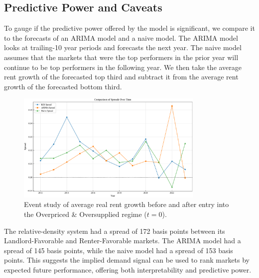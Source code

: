\documentclass[APA,Times1COL]{WileyNJDv5} %
\begin{document}
\subsection{Predictive Power and Caveats}

To gauge if the predictive power offered by the model is significant, we compare it to the forecasts of an ARIMA model and a naive model. The ARIMA model looks at trailing-10 year periods and forecasts the next year. The naive model assumes that the markets that were the top performers in the prior year will continue to be top performers in the following year. We then take the average rent growth of the forecasted top third and subtract it from the average rent growth of the forecasted bottom third.

\begin{figure}[h]
	\centering
	\includegraphics[width=0.8\textwidth]{spread_comparison_over_time.pdf}
	\caption*{Event study of average real rent growth before and after entry into the Overpriced \& Oversupplied regime ($t=0$).}
	\label{fig:spread_compare}
\end{figure}


The relative-density system had a spread of 172 basis points between its Landlord-Favorable and Renter-Favorable markets. The ARIMA model had a spread of 145 basis points, while the naive model had a spread of 153 basis points. This suggests the implied demand signal can be used to rank markets by expected future performance, offering both interpretability and predictive power.
\end{document}
